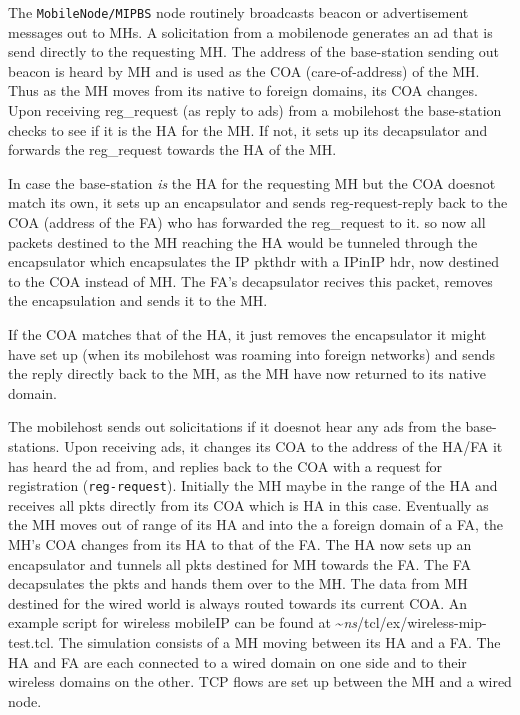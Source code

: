 The {\tt MobileNode/MIPBS} node routinely broadcasts beacon or
advertisement messages out to MHs. A solicitation from a mobilenode
generates an ad that is send directly to the requesting MH. The
address of the base-station sending out beacon is heard by 
MH and is used as the COA (care-of-address) of the MH. Thus as the MH
moves from its native to foreign domains, its COA changes. 
Upon receiving  reg\_request (as reply to ads) from a mobilehost the
base-station checks to see if it is the HA for the MH. If not, it sets
up its decapsulator and forwards the reg\_request towards the HA of
the MH. 

In case the base-station {\em is} the HA for the requesting MH but the
COA doesnot match its own, it sets up an encapsulator and sends
reg-request-reply back to the COA (address of the FA) who has
forwarded the reg\_request to it. so now all packets destined to the
MH reaching the HA would be tunneled through the encapsulator which
encapsulates the IP pkthdr with a IPinIP hdr, now destined to the COA
instead of MH. The FA's decapsulator recives this packet, removes the
encapsulation and sends it to the MH.

If the COA matches that of the HA, it just removes the encapsulator it
might have set up (when its mobilehost was roaming into foreign
networks) and sends the reply directly back to the MH, as the MH have
now returned to its native domain.

The mobilehost sends out solicitations if it doesnot hear any ads from the
base-stations. Upon receiving ads, it changes its COA to the address of
the HA/FA it has heard the ad from, and replies back to the COA with a
request for registration ({\tt reg-request}).
Initially the MH maybe in the range of the HA and receives all pkts
directly from its COA which is HA in this case. 
Eventually as the MH moves out of range of its HA and into the a foreign
domain of a FA, the MH's COA changes from its HA to that of the FA. The HA
now sets up an encapsulator and tunnels all pkts destined for MH towards
the FA. The FA decapsulates the pkts and hands them over to the MH. The
data from MH destined for the wired world is always routed towards its
current COA.  
An example script for wireless mobileIP can be found at
\textasciitilde\emph{ns}/{tcl/ex/wireless-mip-test.tcl}. The simulation consists of a MH moving
between its HA and a FA. The HA and FA are each connected to a wired
domain on one side and to their wireless domains on the other. TCP flows
are set up between the MH and a wired node. 

